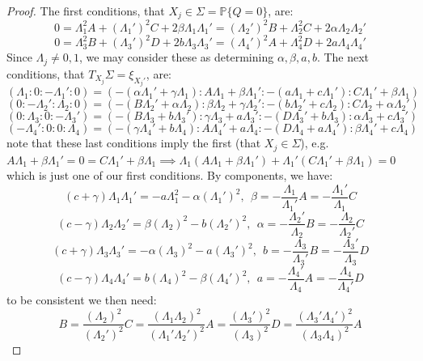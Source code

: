 \documentclass[10pt,a4paper]{amsart}
\begin{document}
     \begin{proof}
         The first conditions, that $X_j\in \Sigma = \mathbb{P}\{ Q = 0\}$, are:
         \[ 0 = \Lambda_1^2 A + (\Lambda_1')^2 C + 2\beta \Lambda_1\Lambda_1' = (\Lambda_2')^2 B + \Lambda_2^2 C + 2\alpha \Lambda_2\Lambda_2' \]
         \[ 0 = \Lambda_3^2 B + (\Lambda_3')^2 D + 2b\Lambda_3\Lambda_3' = (\Lambda_4')^2 A + \Lambda_4^2 D + 2a \Lambda_4\Lambda_4' \]
     Since $\Lambda_j\ne 0,1$, we may consider these as determining $\alpha,\beta, a, b$. The next conditions, that $T_{X_j}\Sigma = \xi_{X_j'}$, are:
     \[   (\Lambda_1:0: -\Lambda_1':0) = (-(\alpha \Lambda_1' + \gamma \Lambda_1): A\Lambda_1+\beta \Lambda_1' : -(a\Lambda_1 +c\Lambda_1'): C\Lambda_1' + \beta \Lambda_1) \]
     \[  (0:-\Lambda_2':\Lambda_2:0) = (-(B\Lambda_2'+\alpha \Lambda_2): \beta \Lambda_2 + \gamma \Lambda_2' : -(b\Lambda_2'+c\Lambda_2): C\Lambda_2+ \alpha \Lambda_2' ) \]
     \[ (0:\Lambda_3:0:-\Lambda_3') = (-(B\Lambda_3  + b\Lambda_3'):  \gamma \Lambda_3 + a\Lambda_3' : -(D\Lambda_3'+b\Lambda_3):  \alpha \Lambda_3 + c\Lambda_3')\]
     \[  (-\Lambda_4':0:0:\Lambda_4) = (-( \gamma \Lambda_4' + b\Lambda_4): A\Lambda_4' + a\Lambda_4 : -(D\Lambda_4 +a\Lambda_4' ):  \beta \Lambda_4'  + c\Lambda_4)\]
     note that these last conditions imply the first (that $X_j\in \Sigma$), e.g.~$A\Lambda_1 + \beta\Lambda_1' = 0 = C\Lambda_1' + \beta\Lambda_1 \implies \Lambda_1(A\Lambda_1 + \beta\Lambda_1') + \Lambda_1'(C\Lambda_1' + \beta\Lambda_1) = 0$ which is just one of our first conditions. By components, we have:
     \[ (c+\gamma)\Lambda_1\Lambda_1' = -a\Lambda_1^2 - \alpha(\Lambda_1')^2, ~~\beta = -\frac{\Lambda_1}{\Lambda_1'}A = - \frac{\Lambda_1'}{\Lambda_1}C \]
     \[ (c-\gamma)\Lambda_2\Lambda_2' = \beta (\Lambda_2)^2 - b(\Lambda_2')^2, ~~\alpha = -\frac{\Lambda_2'}{\Lambda_2}B = - \frac{\Lambda_2}{\Lambda_2'}C \]
     \[ (c+\gamma)\Lambda_3\Lambda_3' = -\alpha (\Lambda_3)^2 - a(\Lambda_3')^2, ~~b = -\frac{\Lambda_3}{\Lambda_3'}B = - \frac{\Lambda_3'}{\Lambda_3}D \]
     \[ (c-\gamma)\Lambda_4\Lambda_4' = b (\Lambda_4)^2 - \beta(\Lambda_4')^2, ~~a = -\frac{\Lambda_4'}{\Lambda_4}A = - \frac{\Lambda_4}{\Lambda_4'}D \]
     to be consistent we then need:
     \[ B = \frac{(\Lambda_2)^2}{(\Lambda_2')^2}C = \frac{(\Lambda_1\Lambda_2)^2}{(\Lambda_1'\Lambda_2')^2}A = \frac{(\Lambda_3')^2}{(\Lambda_3)^2}D = \frac{(\Lambda_3'\Lambda_4')^2}{(\Lambda_3\Lambda_4)^2}A\]

\end{proof}
\end{document}
